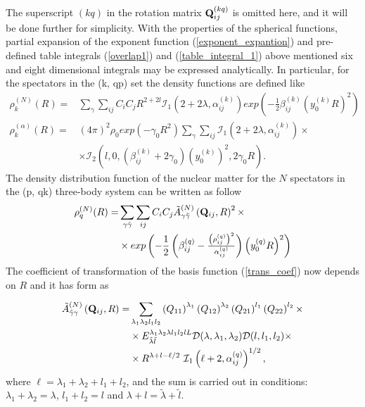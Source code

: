 \documentclass[
12pt, %
oneside, %
english, %
onehalfspacing, %
onehalfspacing, %
headsepline, %
]{MastersDoctoralThesis} %
\begin{document}
The superscript $(kq)$  in the rotation matrix $ {\bf Q}_{ij}^{(kq)}$ is omitted here, and it will be done further for simplicity.
With the properties of the spherical functions, partial expansion of the exponent function (\ref{exponent_expantion}) and pre-defined table integrals (\ref{overlap1}) and (\ref{table_integral_1})
above mentioned six and eight dimensional integrals  may be expressed analytically. In particular, for the spectators in the (k, qp) set the density functions are defined like
\begin{align}
\rho_k^{(N)}(R)=&
\sum_{\gamma }
\sum_{i j} C_{i} C_j R^{2+2l} 
\mathcal{I}_1 \left( 2+2\lambda,\alpha^{(k)}_{ij} \right)
exp\left( - \tfrac{1}{2} \beta^{(k)}_{ij} \left( y^{(k)}_0 R \right)^2\right) \nonumber \\
\rho_{k}^{(\alpha)}(R)=&\left( 4 \pi \right)^2 \rho_0 exp\left( - \gamma_0 R^2 \right)  
\sum_{\gamma }
\sum_{ij}  \mathcal{I}_1\left( 2+2\lambda, \alpha^{(k)}_{ij} \right) \times \nonumber \\
& \times
\mathcal{I}_2 \left( l, 0, (\beta^{(k)}_{ij}+2 \gamma_0) \left( y^{(k)}_0\right)^2, 2\gamma_0 R \right).
\label{kpq_density}
\end{align}
The density distribution function of the nuclear matter for the $N$ spectators in the (p, qk) three-body system can be written as follow
\begin{align}
\rho_q^{(N)}(R)= &
\sum_{\gamma \tilde{\gamma}}
\sum_{ij}
C_i C_j
\tilde{A}^{(N)}_{\gamma\tilde{\gamma}}\left( {\bf Q}_{ij}, R \right)^2
\times \nonumber \\
& \times
exp \left( -\frac{1}{2} 
\left(  \beta^{(q)}_{ij} - \tfrac{\left(\rho^{(q)}_{ij}\right)^2}{\alpha^{(q)}_{ij}} \right) 
\left( y_0^{(q)} R\right)^2\right)
\label{pqk_density_N}
\end{align}
The coefficient of transformation of the basis function  (\ref{trans_coef}) now depends on $R$ and it has form as

 \begin{align}
\tilde{A}^{(N)}_{\tilde{\gamma}\gamma}\left( {\bf Q}_{ij}, R \right) = & \sum_{\lambda_1 \lambda_2 l_1 l_2} 
\left({ Q}_{11} \right)^{\lambda_1} 
\left({ Q}_{12} \right)^{\lambda_2} 
\left({ Q}_{21} \right)^{l_1} 
\left({ Q}_{22} \right)^{l_2} 
\times \nonumber
\\
& \times {E}^{\lambda_1 \lambda_2 \lambda l_1 l_2 l L}_{\tilde{\lambda} \tilde{l} } \mathcal{D}(\lambda,\lambda_1,\lambda_2) \mathcal{D}(l,l_1,l_2)
\times  \nonumber    \\
& \times R^{\lambda+l-\ell/2}~
\mathcal{I}_1\left( \ell +2
, \alpha^{(q)}_{ij} \right)^{1/2},
\end{align}
where $\ell=\lambda_1+\lambda_2+l_1+l_2$, and the sum is carried out in conditions: $\lambda_1+\lambda_2=\lambda$, $l_1+l_2=l$ and $\lambda+l=\tilde{\lambda}+\tilde{l}$.
\end{document}
